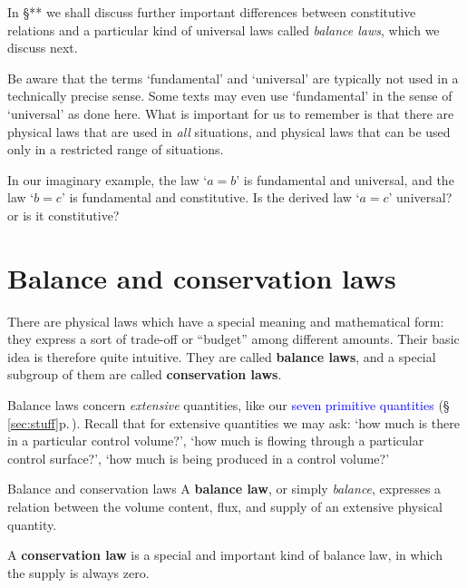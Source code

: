 \documentclass[a4paper,12pt,%
onecolumn,oneside,%
british%
]{memoir}
\renewcommand*{\|}[1][]{\nonscript\:#1\vert\nonscript\:\mathopen{}}
\newcommand*{\sect}{\S}%
\renewcommand*{\autoref}[3][\sect\,\ref]{\textcolor{blue}{#3} {\color{blue}\scriptsize(\faIcon[regular]{eye}\;#1{#2}\;p.\,\pageref{#2})}}
\begin{document}
\medskip

In \sect*** we shall discuss further important differences between constitutive relations and a particular kind of universal laws called \emph{balance laws}, which we discuss next.


\begin{warning}
  Be aware that the terms \enquote*{fundamental} and \enquote*{universal} are typically not used in a technically precise sense. Some texts may even use \enquote*{fundamental} in the sense of \enquote*{universal} as done here. What is important for us to remember is that there are physical laws that are used in \emph{all} situations, and physical laws that can be used only in a restricted range of situations.
\end{warning}

\begin{exercise}
  In our imaginary example, the law \enquote*{$a=b$} is fundamental and universal, and the law \enquote*{$b=c$} is fundamental and constitutive. Is the derived law \enquote*{$a=c$} universal? or is it constitutive?
\end{exercise}

\section{Balance and conservation laws}
\label{sec:balance_intro}

There are physical laws which have a special meaning and mathematical form: they express a sort of trade-off or \enquote{budget} among different amounts. Their basic idea is therefore quite intuitive. They are called \textbf{balance laws}, and a special subgroup of them are called \textbf{conservation laws}.

Balance laws concern \emph{extensive} quantities, like our \autoref{sec:stuff}{seven primitive quantities}. Recall that for extensive quantities we may ask: \enquote*{how much is there in a particular control volume?}, \enquote*{how much is flowing through a particular control surface?}, \enquote*{how much is being produced in a control volume?}
\begin{definition}{Balance and conservation laws}
  A \textbf{balance law}, or simply \emph{balance}, expresses a relation between the volume content, flux, and supply of an extensive physical quantity.

  \smallskip

  A \textbf{conservation law} is a special and important kind of balance law, in which the supply is always zero.
\end{definition}
\end{document}
